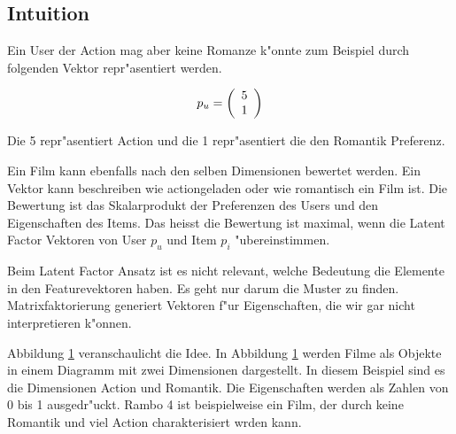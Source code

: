 \documentclass[a4paper, 12pt]{article}
\begin{document}
\subsection{Intuition}
\label{sec:intuition}

Ein User der Action mag aber keine Romanze k"onnte zum Beispiel durch folgenden Vektor repr"asentiert werden.

\begin{equation}
  \label{eq:vektor}
  p_u = \left(
  \begin{array}[c]{c}
    5 \\
    1 
  \end{array}
\right)
\end{equation}

Die 5 repr"asentiert Action und die 1 repr"asentiert die den Romantik Preferenz.

 Ein Film kann ebenfalls nach den selben Dimensionen bewertet werden. Ein Vektor kann beschreiben wie actiongeladen oder wie romantisch ein Film ist. Die Bewertung ist das Skalarprodukt der Preferenzen des Users und den Eigenschaften des Items. Das heisst die Bewertung ist maximal, wenn die Latent Factor Vektoren von User $p_u$ und Item $p_i$ "ubereinstimmen.

Beim Latent Factor Ansatz ist es nicht relevant, welche Bedeutung die Elemente in den Featurevektoren haben. Es geht nur darum die Muster zu finden. Matrixfaktorierung generiert Vektoren f"ur Eigenschaften, die wir gar nicht interpretieren k"onnen.

Abbildung \ref{fig:moviedimension} veranschaulicht die Idee. In Abbildung \ref{fig:moviedimension} werden Filme als Objekte in einem Diagramm mit zwei Dimensionen dargestellt. In diesem Beispiel sind es die Dimensionen Action und Romantik. Die Eigenschaften werden als Zahlen von 0 bis 1 ausgedr"uckt. Rambo 4 ist beispielweise ein Film, der durch keine Romantik und viel Action charakterisiert wrden kann.

\begin{figure}
\centering
{}
\label{fig:moviedimension}
\end{figure}
\end{document}
